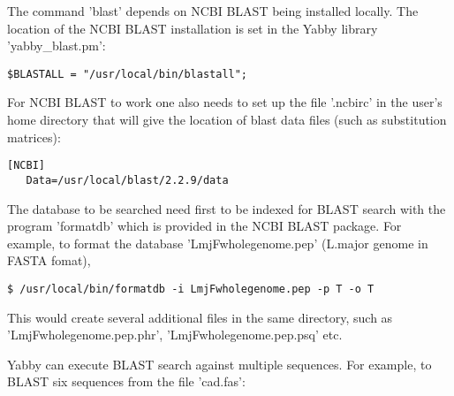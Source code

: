 The command 'blast' depends on NCBI BLAST being installed locally.
The location of the NCBI BLAST installation is set in the
Yabby library 'yabby\_blast.pm':

\begin{verbatim}
$BLASTALL = "/usr/local/bin/blastall";
\end{verbatim}

For NCBI BLAST to work one also needs to set up the file
'.ncbirc' in the user's home directory that will give the
location of blast data files (such as substitution matrices): 

\begin{verbatim}
[NCBI]
   Data=/usr/local/blast/2.2.9/data
\end{verbatim}

The database to be searched need first to be indexed for BLAST
search with the program 'formatdb' which is provided in the
NCBI BLAST package.  For example, to format the database
'LmjFwholegenome.pep' (L.major genome in FASTA fomat),

\begin{verbatim}
$ /usr/local/bin/formatdb -i LmjFwholegenome.pep -p T -o T
\end{verbatim}

This would create several additional files in the same directory,
such as 'LmjFwholegenome.pep.phr', 'LmjFwholegenome.pep.psq' etc.

Yabby can execute BLAST search against multiple sequences. For
example, to BLAST six sequences from the file 'cad.fas':

